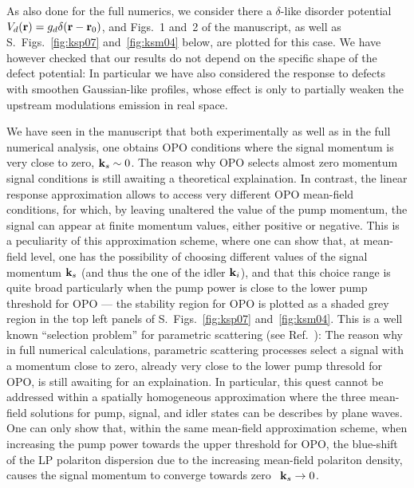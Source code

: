 As also done for the full numerics, we
consider there a $\delta$-like disorder potential $V_d({\mathbf r}) = g_d
\delta({\mathbf r} - {\mathbf r}_0)$, and Figs.~1 and~2 of the manuscript,
as well as S.~Figs.~\ref{fig:ksp07} and~\ref{fig:ksm04} below, are
plotted for this case.
%
We have however checked that our results do not depend on the specific
shape of the defect potential: In particular we have also considered
the response to defects with smoothen Gaussian-like profiles, whose
effect is only to partially weaken the upstream modulations emission
in real space.

We have seen in the manuscript that both experimentally as well as in
the full numerical analysis, one obtains OPO conditions where the
signal momentum is very close to zero, ${\mathbf k}_s \sim 0$. The reason
why OPO selects almost zero momentum signal conditions is still
awaiting a theoretical explaination.
%
In contrast, the linear response approximation allows to access very
different OPO mean-field conditions, for which, by leaving unaltered
the value of the pump momentum, the signal can appear at finite
momentum values, either positive or negative.
%
This is a peculiarity of this approximation scheme, where one can show
that, at mean-field level, one has the possibility of choosing
different values of the signal momentum ${\mathbf k}_s$ (and thus the one
of the idler ${\mathbf k}_i$), and that this choice range is quite broad
particularly when the pump power is close to the lower pump threshold
for OPO --- the stability region for OPO is plotted as a shaded grey
region in the top left panels of S.~Figs.~\ref{fig:ksp07}
and~\ref{fig:ksm04}. This is a well known ``selection problem'' for
parametric scattering (see Ref.~\cite{Wouters_2007_b}): The reason why
in full numerical calculations, parametric scattering processes select
a signal with a momentum close to zero, already very close to the
lower pump thresold for OPO, is still awaiting for an explaination. In
particular, this quest cannot be addressed within a spatially
homogeneous approximation where the three mean-field solutions for
pump, signal, and idler states can be describes by plane waves.
One can only show that, within the same mean-field approximation
scheme, when increasing the pump power towards the upper threshold for
OPO, the blue-shift of the LP polariton dispersion due to the
increasing mean-field polariton density, causes the signal momentum to
converge towards zero~\cite{Whittaker_2005} ${\mathbf k}_s \to 0$.

